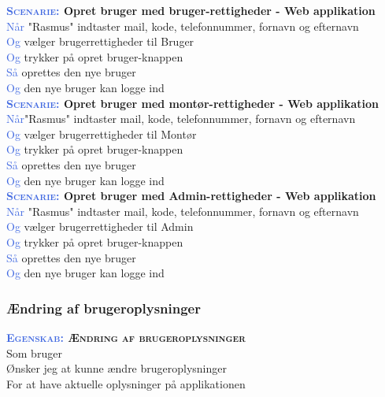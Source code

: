 \textbf{\textsc{\textcolor{RoyalBlue}{Scenarie:}} Opret bruger med bruger-rettigheder - Web applikation}\\
\textcolor{RoyalBlue}{Når} "Rasmus" indtaster mail, kode, telefonnummer, 
fornavn og efternavn \\
\textcolor{RoyalBlue}{Og} vælger brugerrettigheder til Bruger\\
\textcolor{RoyalBlue}{Og} trykker på opret bruger-knappen\\
\textcolor{RoyalBlue}{Så} oprettes den nye bruger\\
\textcolor{RoyalBlue}{Og} den nye bruger kan logge ind\\

\textbf{\textsc{\textcolor{RoyalBlue}{Scenarie:}} Opret bruger med montør-rettigheder - Web applikation}\\
\textcolor{RoyalBlue}{Når}"Rasmus" indtaster mail, kode, telefonnummer, 
fornavn og efternavn \\
\textcolor{RoyalBlue}{Og} vælger brugerrettigheder til Montør\\
\textcolor{RoyalBlue}{Og} trykker på opret bruger-knappen\\
\textcolor{RoyalBlue}{Så} oprettes den nye bruger\\
\textcolor{RoyalBlue}{Og} den nye bruger kan logge ind\\

\textbf{\textsc{\textcolor{RoyalBlue}{Scenarie:}} Opret bruger med Admin-rettigheder - Web applikation}\\
\textcolor{RoyalBlue}{Når} "Rasmus" indtaster mail, kode, telefonnummer, 
fornavn og efternavn \\
\textcolor{RoyalBlue}{Og} vælger brugerrettigheder til Admin\\
\textcolor{RoyalBlue}{Og} trykker på opret bruger-knappen\\
\textcolor{RoyalBlue}{Så} oprettes den nye bruger\\
\textcolor{RoyalBlue}{Og} den nye bruger kan logge ind\\


\subsubsection{Ændring af brugeroplysninger}
\textbf{\textsc{\textcolor{RoyalBlue}{Egenskab:} Ændring af brugeroplysninger}}\\
Som bruger\\
Ønsker jeg at kunne ændre brugeroplysninger\\
For at have aktuelle oplysninger på applikationen\\

